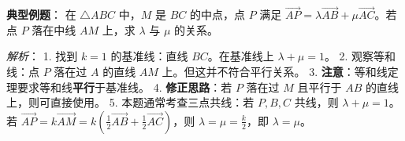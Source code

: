 \begin{examplebox}
\textbf{典型例题}：
在 $\triangle ABC$ 中，$M$ 是 $BC$ 的中点，点 $P$ 满足 $\vec{AP} = \lambda \vec{AB} + \mu \vec{AC}$。若点 $P$ 落在中线 $AM$ 上，求 $\lambda$ 与 $\mu$ 的关系。

\textit{解析}：
1. 找到 $k=1$ 的基准线：直线 $BC$。在基准线上 $\lambda + \mu = 1$。
2. 观察等和线：点 $P$ 落在过 $A$ 的直线 $AM$ 上。但这并不符合平行关系。
3. \textbf{注意}：等和线定理要求等和线\textbf{平行}于基准线。
4. \textbf{修正思路}：若 $P$ 落在过 $M$ 且平行于 $AB$ 的直线上，则可直接使用。
5. 本题通常考查三点共线：若 $P, B, C$ 共线，则 $\lambda + \mu = 1$。若 $\vec{AP} = k\vec{AM} = k(\frac{1}{2}\vec{AB} + \frac{1}{2}\vec{AC})$，则 $\lambda = \mu = \frac{k}{2}$，即 $\lambda = \mu$。
\end{examplebox}